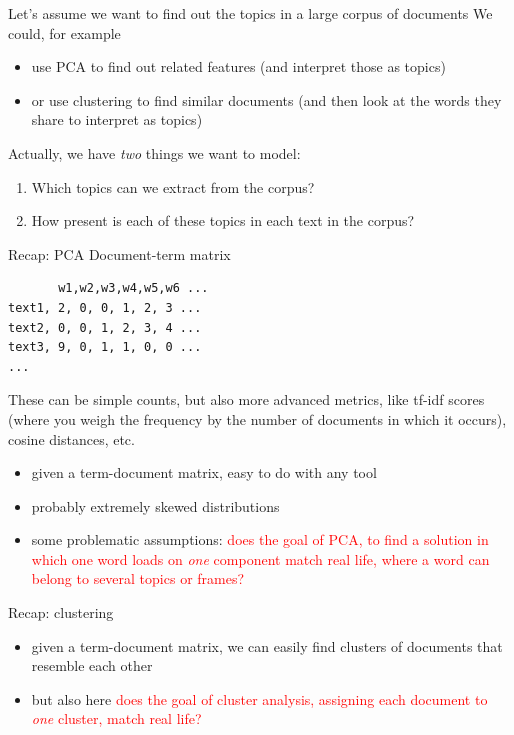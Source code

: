 \documentclass{beamer}
\begin{document}
\begin{frame}{Let's assume we want to find out the topics in a large corpus of documents}
We could, for example
\begin{itemize}
	\item use PCA to find out related features (and interpret those as topics)
	\item or use clustering to find similar documents (and then look at the words they share to interpret as topics)
\end{itemize}

\pause

Actually, we have \emph{two} things we want to model:

\begin{enumerate}
	\item Which topics can we extract from the corpus?
	\item How present is each of these topics in each text in the corpus?
\end{enumerate}

\end{frame}


\begin{frame}[fragile]{Recap: PCA}
Document-term matrix
\begin{lstlisting}
       w1,w2,w3,w4,w5,w6 ...
text1, 2, 0, 0, 1, 2, 3 ...
text2, 0, 0, 1, 2, 3, 4 ...
text3, 9, 0, 1, 1, 0, 0 ...
...
\end{lstlisting}
{\small{These can be simple counts, but also more advanced metrics, like tf-idf scores (where you weigh the frequency by the number of documents in which it occurs), cosine distances, etc.}}
\pause
	\begin{itemize}
	\item given a term-document matrix, easy to do with any tool
	\item probably extremely skewed distributions
	\item some problematic assumptions: \textcolor{red}{does the goal of PCA, to find a solution in which one word loads on \emph{one} component match real life, where a word can belong to several topics or frames?}
\end{itemize}

\end{frame}


\begin{frame}{Recap: clustering}
\begin{itemize}
	\item given a term-document matrix, we can easily find clusters of documents that resemble each other
	\item but also here \textcolor{red}{does the goal of cluster analysis, assigning each document to \emph{one} cluster, match real life?}
\end{itemize}
\end{frame}
\end{document}

